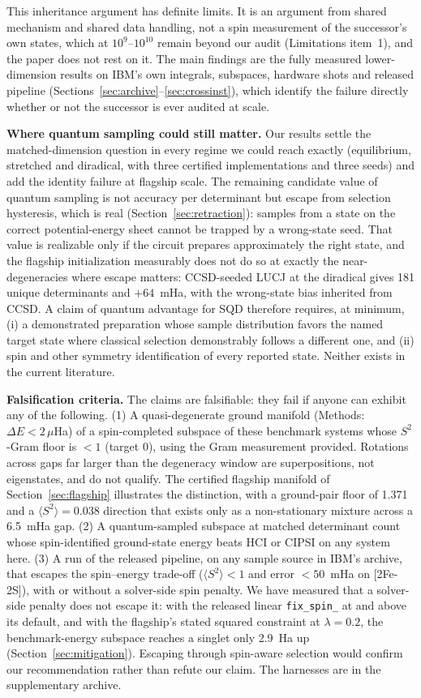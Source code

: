 \documentclass[11pt]{article}
\newcommand{\ssq}{\ensuremath{\langle S^2\rangle}}
\begin{document}
This inheritance argument has definite limits. It is an argument from shared mechanism and shared data handling, not a spin measurement of the successor's own states, which at $10^{9}$--$10^{10}$ remain beyond our audit (Limitations item~1), and the paper does not rest on it. The main findings are the fully measured lower-dimension results on IBM's own integrals, subspaces, hardware shots and released pipeline (Sections~\ref{sec:archive}--\ref{sec:crossinst}), which identify the failure directly whether or not the successor is ever audited at scale.

\textbf{Where quantum sampling could still matter.} Our results settle the matched-dimension question in every regime we could reach exactly (equilibrium, stretched and diradical, with three certified implementations and three seeds) and add the identity failure at flagship scale. The remaining candidate value of quantum sampling is not accuracy per determinant but escape from selection hysteresis, which is real (Section~\ref{sec:retraction}): samples from a state on the correct potential-energy sheet cannot be trapped by a wrong-state seed. That value is realizable only if the circuit prepares approximately the right state, and the flagship initialization measurably does not do so at exactly the near-degeneracies where escape matters: CCSD-seeded LUCJ at the diradical gives 181 unique determinants and $+64$~mHa, with the wrong-state bias inherited from CCSD. A claim of quantum advantage for SQD therefore requires, at minimum, (i) a demonstrated preparation whose sample distribution favors the named target state where classical selection demonstrably follows a different one, and (ii) spin and other symmetry identification of every reported state. Neither exists in the current literature.

\textbf{Falsification criteria.} The claims are falsifiable: they fail if anyone can exhibit any of the following. (1) A quasi-degenerate ground manifold (Methods: $\Delta E < 2\,\mu$Ha) of a spin-completed subspace of these benchmark systems whose $S^2$-Gram floor is $< 1$ (target 0), using the Gram measurement provided. Rotations across gaps far larger than the degeneracy window are superpositions, not eigenstates, and do not qualify. The certified flagship manifold of Section~\ref{sec:flagship} illustrates the distinction, with a ground-pair floor of 1.371 and a $\ssq = 0.038$ direction that exists only as a non-stationary mixture across a 6.5~mHa gap. (2) A quantum-sampled subspace at matched determinant count whose spin-identified ground-state energy beats HCI or CIPSI on any system here. (3) A run of the released pipeline, on any sample source in IBM's archive, that escapes the spin--energy trade-off ($\ssq < 1$ and error $< 50$~mHa on [2Fe-2S]), with or without a solver-side spin penalty. We have measured that a solver-side penalty does not escape it: with the released linear \texttt{fix\_spin\_} at and above its default, and with the flagship's stated squared constraint at $\lambda = 0.2$, the benchmark-energy subspace reaches a singlet only 2.9~Ha up (Section~\ref{sec:mitigation}). Escaping through spin-aware selection would confirm our recommendation rather than refute our claim. The harnesses are in the supplementary archive.
\end{document}
